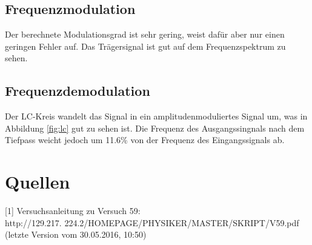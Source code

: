 \documentclass[]{scrartcl}
\begin{document}
\subsection{Frequenzmodulation}
Der berechnete Modulationsgrad ist sehr gering, weist dafür aber nur einen geringen Fehler auf. Das Trägersignal ist gut auf dem Frequenzspektrum zu sehen.

\subsection{Frequenzdemodulation}
Der LC-Kreis wandelt das Signal in ein amplitudenmoduliertes Signal um, was in Abbildung \ref{fig:lc} gut zu sehen ist. Die Frequenz des Ausgangssingnals nach dem Tiefpass weicht jedoch um 11.6\% von der Frequenz des Eingangssignals ab.

\section{Quellen}
{[1]} Versuchsanleitung zu Versuch 59: \\
http://129.217.
224.2/HOMEPAGE/PHYSIKER/MASTER/SKRIPT/V59.pdf (letzte Version vom 30.05.2016, 10:50)\\
\end{document}
